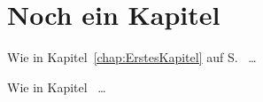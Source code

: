 \chapter{Noch ein Kapitel}
    Wie in Kapitel~\ref{chap:ErstesKapitel} auf S.~\pageref{chap:ErstesKapitel} \ldots

    Wie in Kapitel~ \ldots
